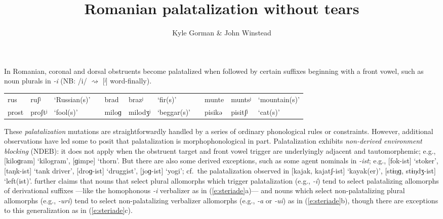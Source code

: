 \documentclass[11pt,letterpaper]{article}
\title{Romanian palatalization without tears}
\author{Kyle Gorman \& John Winstead}
\affil{CUNY Graduate Center, New York}
\date{}
\newcommand{\word}[1]{\textit{#1}}
\newcommand{\term}[1]{\textit{#1}}
\newif\ifanon
\begin{document}
\pagestyle{empty}
\thispagestyle{empty}

\ifanon
\begin{center}
\textbf{
Romanian palatalization without tears
}
\end{center}
\else
\maketitle
\fi

In Romanian, coronal and dorsal obstruents become palatalized when followed by certain suffixes beginning with a front vowel, such as noun plurals in \word{-i}
(NB: /i/ $\rightsquigarrow$ [ʲ] word-finally).
\vspace{-\topsep}
\begin{unlabeledexample}
\begin{tabular}{lll l lll l lll}
ru{s}   & ru{ʃ}ʲ   & `Russian(s)'  && bra{d}    & bra{z}ʲ   & `fir(s)'
                                    && mun{t}e & mun{ts}ʲ & `mountain(s)' \\
pro{s}t & pro{ʃ}tʲ & `fool(s)'     && miloɡ & milo{dʒ}ʲ & `beggar(s)'
                                    && pisi{k}ə  & pisi{tʃ}ʲ & `cat(s)' \\
\end{tabular}
\label{e:noun-plurals}
\end{unlabeledexample}

\noindent
These \term{palatalization} mutations are straightforwardly handled by a series of ordinary phonological rules or constraints.
However, additional observations have led some \citep[e.g.,][]{Chitoran:01} to posit that palatalization is morphophonological in part.
Palatalization exhibits \term{non-derived environment blocking} (NDEB):
it does not apply when the obstruent target and front vowel trigger are underlyingly adjacent and tautomorphemic;
e.g., [{ki}loɡram] `kilogram', [{ɡi}mpe] `thorn'.
But there are also some derived exceptions,
such as some agent nominals in \word{-ist};
e.g., [fok-ist] `stoker', [taŋk-ist] `tank driver', [droɡ-ist] `druggist', [joɡ-ist] `yogi';
cf.~the palatalization observed in [kajak, kajatʃ-ist] `kayak(er)', [stɨŋɡ, stɨŋdʒ-ist] `left(ist)'.
\citet{Steriade:08} further claims that nouns that select plural allomorphs which trigger palatalization (e.g., \word{-i}) tend to select palatalizing allomorphs of derivational suffixes%
---like the homophonous \word{-i} verbalizer as in (\ref{e:steriade}a)---%
and nouns which select non-palatalizing plural allomorphs (e.g., \word{-uri}) tend to select non-palatalizing verbalizer allomorphs (e.g., \word{-a} or \word{-ui}) as in (\ref{e:steriade}b),
though there are exceptions to this generalization as in (\ref{e:steriade}c).
\end{document}
